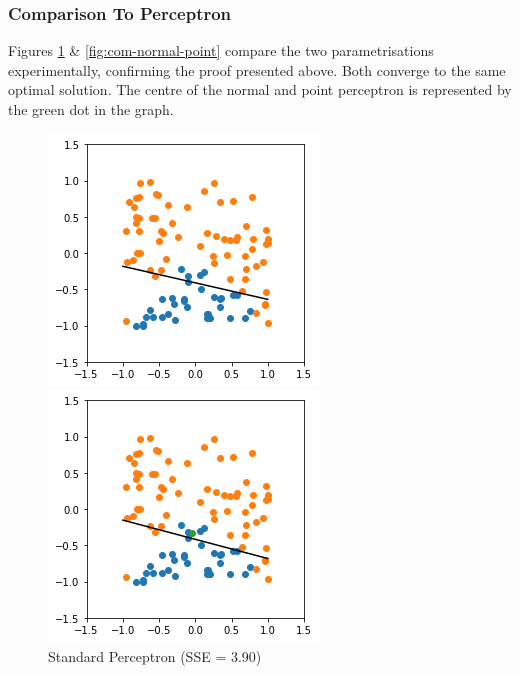 \documentclass[notitlepage]{report}
\theoremstyle{definition}
\begin{document}
\subsubsection{Comparison To Perceptron}
Figures \ref{fig:com-standard-perceptron} \& \ref{fig:com-normal-point} compare the two parametrisations experimentally, confirming the proof presented above. Both converge to the same optimal solution. The centre of the normal and point perceptron is represented by the green dot in the graph.\\


\begin{figure}[H]
\centering
  \begin{minipage}[b]{0.4\textwidth}
    \includegraphics[width=\textwidth]{Standard-Perceptron.png}
    \caption{Standard Perceptron (SSE = 3.90)}
    \label{fig:com-standard-perceptron}
  \end{minipage}
  \hfill
  \begin{minipage}[b]{0.4\textwidth}
    \includegraphics[width=\textwidth]{Modified-Perceptron-(Normal-Point).png}

\end{minipage}
\end{figure}
\end{document}
